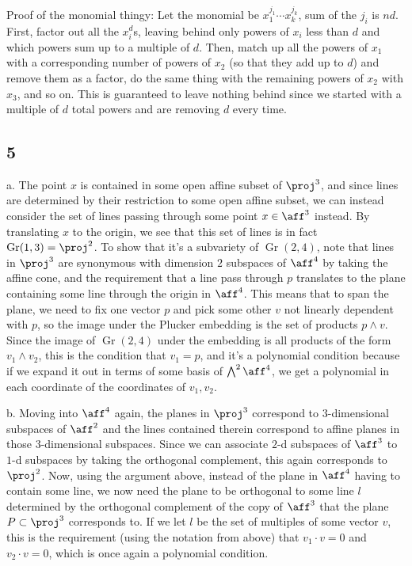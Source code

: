 \documentclass{article}
\DeclareMathOperator{\Gr}{Gr}
\begin{document}
Proof of the monomial thingy: Let the monomial be $x_1^{j_1}\cdots x_k^{j_k}$, sum of the $j_i$ is $nd$. First, factor out all the $x_i^d$s, leaving behind only powers of $x_i$ less than $d$ and which powers sum up to a multiple of $d$. Then, match up all the powers of $x_1$ with a corresponding number of powers of $x_2$ (so that they add up to $d$) and remove them as a factor, do the same thing with the remaining powers of $x_2$ with $x_3$, and so on. This is guaranteed to leave nothing behind since we started with a multiple of $d$ total powers and are removing $d$ every time.
\subsection*{5}
a. The point $x$ is contained in some open affine subset of $\proj^3$, and since lines are determined by their restriction to some open affine subset, we can instead consider the set of lines passing through some point $x\in\aff^3$ instead. By translating $x$ to the origin, we see that this set of lines is in fact $\Gr(1,3)=\proj^2$. To show that it's a subvariety of $\Gr(2,4)$, note that lines in $\proj^3$ are synonymous with dimension $2$ subspaces of $\aff^4$ by taking the affine cone, and the requirement that a line pass through $p$ translates to the plane containing some line through the origin in $\aff^4$. This means that to span the plane, we need to fix one vector $p$ and pick some other $v$ not linearly dependent with $p$, so the image under the Plucker embedding is the set of products $p\wedge v$. Since the image of $\Gr(2,4)$ under the embedding is all products of the form $v_1\wedge v_2$, this is the condition that $v_1=p$, and it's a polynomial condition because if we expand it out in terms of some basis of $\bigwedge^2 \aff^4$, we get a polynomial in each coordinate of the coordinates of $v_1,v_2$.

b. Moving into $\aff^4$ again, the planes in $\proj^3$ correspond to $3$-dimensional subspaces of $\aff^2$ and the lines contained therein correspond to affine planes in those $3$-dimensional subspaces. Since we can associate $2$-d subspaces of $\aff^3$ to $1$-d subspaces by taking the orthogonal complement, this again corresponds to $\proj^2$. Now, using the argument above, instead of the plane in $\aff^4$ having to contain some line, we now need the plane to be orthogonal to some line $l$ determined by the orthogonal complement of the copy of $\aff^3$ that the plane $P\subset\proj^3$ corresponds to. If we let $l$ be the set of multiples of some vector $v$, this is the requirement (using the notation from above) that $v_1\cdot v=0$ and $v_2\cdot v=0$, which is once again a polynomial condition.
\end{document}
